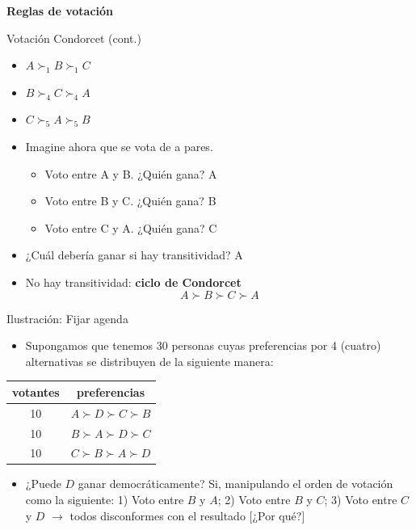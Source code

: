 \documentclass[
  ignorenonframetext,
]{beamer}
\providecommand{\tightlist}{%
  \setlength{\itemsep}{0pt}\setlength{\parskip}{0pt}}\usepackage{longtable,booktabs,array}
\begin{document}
\begin{frame}{\textbf{Reglas de votación}}
\begin{block}{Votación Condorcet (cont.)}
\protect\hypertarget{votaciuxf3n-condorcet-cont.-1}{}
\begin{itemize}
\item
  \(A \succ_{1} B \succ_{1} C\)
\item
  \(B \succ_{4} C \succ_{4} A\)
\item
  \(C \succ_{5} A \succ_{5} B\)
\item
  Imagine ahora que se vota de a pares.

  \begin{itemize}
  \tightlist
  \item
    Voto entre A y B. ¿Quién gana? A
  \item
    Voto entre B y C. ¿Quién gana? B
  \item
    Voto entre C y A. ¿Quién gana? C
  \end{itemize}
\item
  ¿Cuál debería ganar si hay transitividad? A
\item
  No hay transitividad: \textbf{ciclo de Condorcet}
  \[A \succ B \succ C \succ A\]
\end{itemize}
\end{block}

\begin{block}{Ilustración: Fijar agenda}
\protect\hypertarget{ilustraciuxf3n-fijar-agenda}{}
\begin{itemize}
\tightlist
\item
  Supongamos que tenemos 30 personas cuyas preferencias por 4 (cuatro)
  alternativas se distribuyen de la siguiente manera:
\end{itemize}

\hypertarget{tab:tab1}{}
\begin{longtable}[]{@{}cc@{}}
\toprule()
votantes & preferencias \\
\midrule()
\endhead
10 & \(A \succ D \succ C \succ B\) \\
10 & \(B \succ A \succ D \succ C\) \\
10 & \(C \succ B \succ A \succ D\) \\
\bottomrule()
\end{longtable}

\begin{itemize}
\tightlist
\item
  ¿Puede \(D\) ganar democráticamente? Si, manipulando el orden de
  votación como la siguiente: 1) Voto entre \(B\) y \(A\); 2) Voto entre
  \(B\) y \(C\); 3) Voto entre \(C\) y \(D\) \(\longrightarrow\) todos
  disconformes con el resultado {[}¿Por qué?{]}
\end{itemize}
\end{block}


\end{frame}
\end{document}
